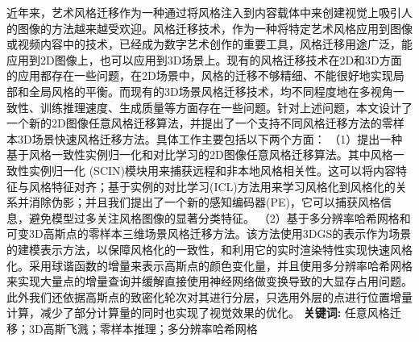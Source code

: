 \cleardoublepage
{}

\setlength{\parindent}{2em} 
近年来，艺术风格迁移作为一种通过将风格注入到内容载体中来创建视觉上吸引人的图像的方法越来越受欢迎。风格迁移技术，作为一种将特定艺术风格应用到图像或视频内容中的技术，已经成为数字艺术创作的重要工具，风格迁移用途广泛，能应用到2D图像上，也可以应用到3D场景上。现有的风格迁移技术在2D和3D方面的应用都存在一些问题，在2D场景中，风格的迁移不够精细、不能很好地实现局部和全局风格的平衡。而现有的3D场景风格迁移技术，均不同程度地在多视角一致性、训练推理速度、生成质量等方面存在一些问题。针对上述问题，本文设计了一个新的2D图像任意风格迁移算法，并提出了一个支持不同风格迁移方法的零样本3D场景快速风格迁移方法。具体工作主要包括以下两个方面：
\newline \indent（1）提出一种基于风格一致性实例归一化和对比学习的2D图像任意风格迁移算法。其中风格一致性实例归一化 (SCIN)模块用来捕获远程和非本地风格相关性。这可以将内容特征与风格特征对齐；基于实例的对比学习(ICL)方法用来学习风格化到风格化的关系并消除伪影；并且我们提出了一个新的感知编码器(PE)，它可以捕获风格信息，避免模型过多关注风格图像的显著分类特征。   
\newline \indent（2）基于多分辨率哈希网格和可变3D高斯点的零样本三维场景风格迁移方法。该方法使用3DGS的表示作为场景的建模表示方法，以保障风格化的一致性，和利用它的实时渲染特性实现快速风格化。采用球谐函数的增量来表示高斯点的颜色变化量，并且使用多分辨率哈希网格来实现大量点的增量查询并缓解直接使用神经网络做变换导致的大显存占用问题。此外我们还依据高斯点的致密化轮次对其进行分层，只选用外层的点进行位置增量计算，减少了部分计算量的同时也实现了视觉效果的优化。
\newline
{\textbf{关键词:}}
任意风格迁移；3D高斯飞溅；零样本推理；多分辨率哈希网格

